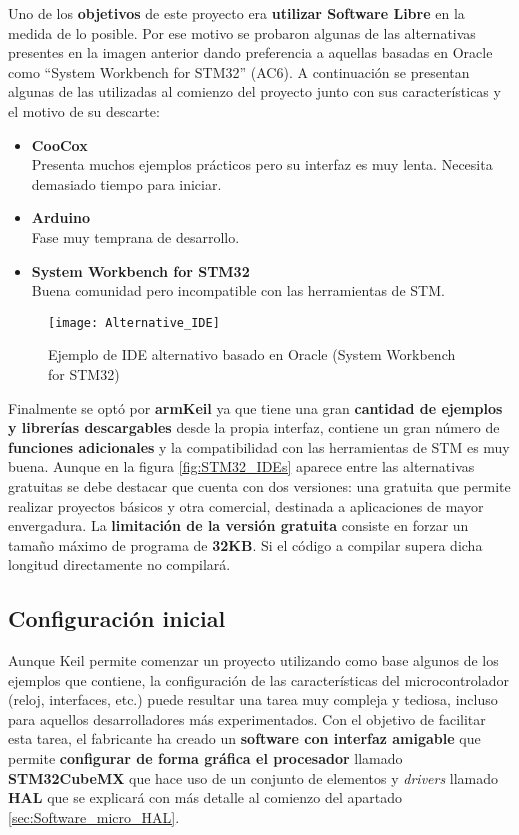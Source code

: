 Uno de los \textbf{objetivos} de este proyecto era \textbf{utilizar Software Libre} en la medida de lo posible. Por ese motivo se probaron algunas de las alternativas presentes en la imagen anterior dando preferencia a aquellas basadas en Oracle como ``System Workbench for STM32'' (AC6). A continuación se presentan algunas de las utilizadas al comienzo del proyecto junto con sus características y el motivo de su descarte:
\begin{itemize}
   \item \textbf{CooCox}\\
   Presenta muchos ejemplos prácticos pero su interfaz es muy lenta. Necesita demasiado tiempo para iniciar.
   \item \textbf{Arduino}\\
   Fase muy temprana de desarrollo.
   \item \textbf{System Workbench for STM32}
   \\Buena comunidad pero incompatible con las herramientas de STM.
\end{itemize}

\begin{figure} [h]
    \centering
    \texttt{[image: Alternative\_IDE]}
    \caption{Ejemplo de IDE alternativo basado en Oracle (System Workbench for STM32)}
    \label{fig:Alternative_IDE}
\end{figure}

Finalmente se optó por \textbf{armKeil} ya que tiene una gran \textbf{cantidad de ejemplos y librerías descargables} desde la propia interfaz, contiene un gran número de \textbf{funciones adicionales} y la compatibilidad con las herramientas de STM es muy buena. Aunque en la figura \ref{fig:STM32_IDEs} aparece entre las alternativas gratuitas se debe destacar que cuenta con dos versiones: una gratuita que permite realizar proyectos básicos y otra comercial, destinada a aplicaciones de mayor envergadura. La \textbf{limitación de la versión gratuita} consiste en forzar un tamaño máximo de programa de \textbf{32KB}. Si el código a compilar supera dicha longitud directamente no compilará.

\subsection{Configuración inicial\label{sec:Configuracion_micro}}

Aunque Keil permite comenzar un proyecto utilizando como base algunos de los ejemplos que contiene, la configuración de las características del microcontrolador (reloj, interfaces, etc.) puede resultar una tarea muy compleja y tediosa, incluso para aquellos desarrolladores más experimentados. Con el objetivo de facilitar esta tarea, el fabricante ha creado un \textbf{software con interfaz amigable} que permite \textbf{configurar de forma gráfica el procesador} llamado \textbf{STM32CubeMX} que hace uso de un conjunto de elementos y \textit{drivers} llamado \textbf{\acrshort{HAL}} que se explicará con más detalle al comienzo del apartado \ref{sec:Software_micro_HAL}.

